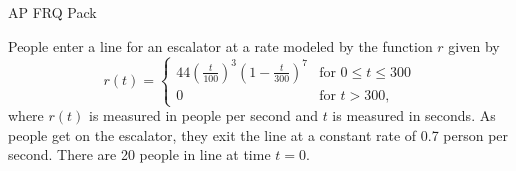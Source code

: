 \documentclass[12pt,addpoints,answers]{exam}
\begin{document}
\begin{center}
{\Large AP FRQ Pack}
\end{center}
\begin{questions}
\question
People enter a line for an escalator at a rate modeled by the function $r$ given by $$r(t) = \begin{cases} 44\left(\frac{t}{100}\right)^3\left(1-\frac{t}{300}\right)^7 & \text{for } 0 \le t \le 300 \\ 0 & \text{for } t > 300, \end{cases}$$ where $r(t)$ is measured in people per second and $t$ is measured in seconds. As people get on the escalator, they exit the line at a constant rate of 0.7 person per second. There are 20 people in line at time $t = 0$.
\end{questions}
\end{document}
